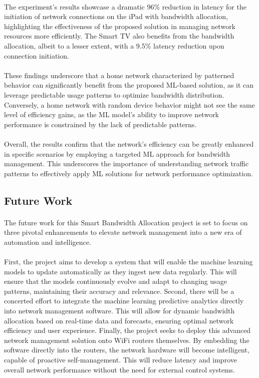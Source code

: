 \documentclass[10pt]{article}
\begin{document}
\paragraph{}
The experiment's results showcase a dramatic 96\% reduction in latency for the initiation of network connections on the iPad with bandwidth allocation, highlighting the effectiveness of the proposed solution in managing network resources more efficiently. The Smart TV also benefits from the bandwidth allocation, albeit to a lesser extent, with a 9.5\% latency reduction upon connection initiation.
\paragraph{}
These findings underscore that a home network characterized by patterned behavior can significantly benefit from the proposed ML-based solution, as it can leverage predictable usage patterns to optimize bandwidth distribution. Conversely, a home network with random device behavior might not see the same level of efficiency gains, as the ML model's ability to improve network performance is constrained by the lack of predictable patterns.
\paragraph{}
Overall, the results confirm that the network's efficiency can be greatly enhanced in specific scenarios by employing a targeted ML approach for bandwidth management. This underscores the importance of understanding network traffic patterns to effectively apply ML solutions for network performance optimization.

\subsection{Future Work}
\paragraph{}
The future work for this Smart Bandwidth Allocation project is set to focus on three pivotal enhancements to elevate network management into a new era of automation and intelligence. 
\paragraph{}
First, the project aims to develop a system that will enable the machine learning models to update automatically as they ingest new data regularly. This will ensure that the models continuously evolve and adapt to changing usage patterns, maintaining their accuracy and relevance. Second, there will be a concerted effort to integrate the machine learning predictive analytics directly into network management software. This will allow for dynamic bandwidth allocation based on real-time data and forecasts, ensuring optimal network efficiency and user experience. Finally, the project seeks to deploy this advanced network management solution onto WiFi routers themselves. By embedding the software directly into the routers, the network hardware will become intelligent, capable of proactive self-management. This will reduce latency and improve overall network performance without the need for external control systems. 
\end{document}
